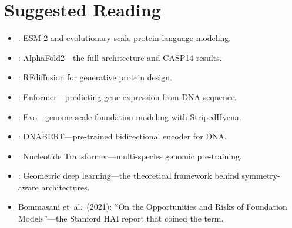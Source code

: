 \section*{Suggested Reading}
\begin{itemize}[leftmargin=1.5em]
  \item \citet{lin2023}: ESM-2 and evolutionary-scale protein language modeling.
  \item \citet{jumper2021}: AlphaFold2---the full architecture and CASP14 results.
  \item \citet{watson2023rfdiffusion}: RFdiffusion for generative protein design.
  \item \citet{avsec2021}: Enformer---predicting gene expression from DNA sequence.
  \item \citet{nguyen2024}: Evo---genome-scale foundation modeling with StripedHyena.
  \item \citet{ji2021dnabert}: DNABERT---pre-trained bidirectional encoder for DNA.
  \item \citet{dalla2023nucleotide}: Nucleotide Transformer---multi-species genomic pre-training.
  \item \citet{bronstein2021}: Geometric deep learning---the theoretical framework behind symmetry-aware architectures.
  \item Bommasani et~al.\ (2021): ``On the Opportunities and Risks of Foundation Models''---the Stanford HAI report that coined the term.
\end{itemize}
